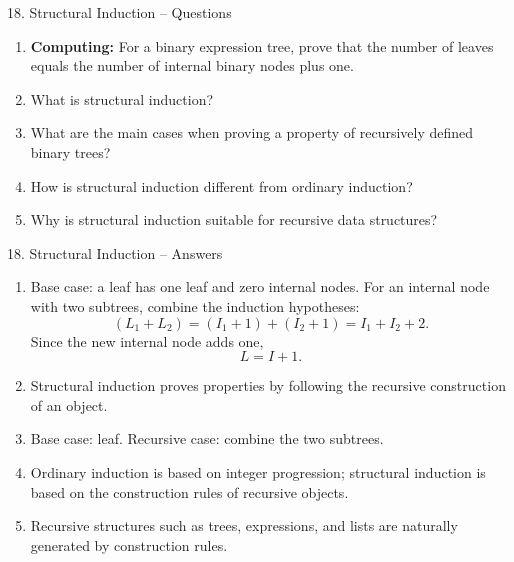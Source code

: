 \documentclass[aspectratio=169,11pt]{beamer}
\begin{document}
\begin{frame}{18. Structural Induction -- Questions}

\begin{enumerate}
\item \textbf{Computing:} For a binary expression tree, prove that the number of leaves equals the number of internal binary nodes plus one.

\item What is structural induction?

\item What are the main cases when proving a property of recursively defined binary trees?

\item How is structural induction different from ordinary induction?

\item Why is structural induction suitable for recursive data structures?
\end{enumerate}

\end{frame}

\begin{frame}{18. Structural Induction -- Answers}

\begin{enumerate}
\item Base case: a leaf has one leaf and zero internal nodes. For an internal node with two subtrees, combine the induction hypotheses:
\[
(L_1+L_2)=(I_1+1)+(I_2+1)
=I_1+I_2+2.
\]
Since the new internal node adds one,
\[
L=I+1.
\]

\item Structural induction proves properties by following the recursive construction of an object.

\item Base case: leaf. Recursive case: combine the two subtrees.

\item Ordinary induction is based on integer progression; structural induction is based on the construction rules of recursive objects.

\item Recursive structures such as trees, expressions, and lists are naturally generated by construction rules.
\end{enumerate}

\end{frame}

\end{document}
